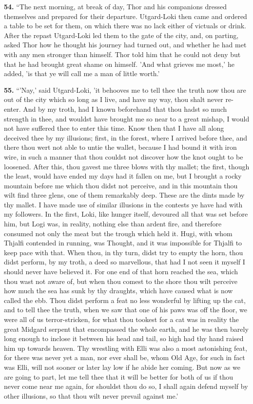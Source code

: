 \textbf{54.} ``The next morning, at break of day, Thor and his companions
dressed themselves and prepared for their departure. Utgard-Loki then
came and ordered a table to be set for them, on which there was no
lack either of victuals or drink. After the repast Utgard-Loki led
them to the gate of the city, and, on parting, asked Thor how he
thought his journey had turned out, and whether he had met with any
men stronger than himself. Thor told him that he could not deny but
that he had brought great shame on himself. 'And what grieves me
most,' he added, 'is that ye will call me a man of little worth.'

\textbf{55.} ``'Nay,' said Utgard-Loki, 'it behooves me to tell thee the truth
now thou are out of the city which so long as I live, and have my way,
thou shalt never re-enter. And by my troth, had I known beforehand
that thou hadst so much strength in thee, and wouldst have brought me
so near to a great mishap, I would not have suffered thee to enter
this time. Know then that I have all along deceived thee by my
illusions; first, in the forest, where I arrived before thee, and
there thou wert not able to untie the wallet, because I had bound it
with iron wire, in such a manner that thou couldst not discover how
the knot ought to be loosened. After this, thou gavest me three blows
with thy mallet; the first, though the least, would have ended my days
had it fallen on me, but I brought a rocky mountain before me which
thou didst not perceive, and in this mountain thou wilt find three
glens, one of them remarkably deep. These are the dints made by thy
mallet. I have made use of similar illusions in the contests ye have
had with my followers. In the first, Loki, like hunger itself,
devoured all that was set before him, but Logi was, in reality,
nothing else than ardent fire, and therefore consumed not only the
meat but the trough which held it. Hugi, with whom Thjalfi contended
in running, was Thought, and it was impossible for Thjalfi to keep
pace with that. When thou, in thy turn, didst try to empty the horn,
thou didst perform, by my troth, a deed so marvellous, that had I not
seen it myself I should never have believed it. For one end of that
horn reached the sea, which thou wast not aware of, but when thou
comest to the shore thou wilt perceive how much the sea has sunk by
thy draughts, which have caused what is now called the ebb. Thou didst
perform a feat no less wonderful by lifting up the cat, and to tell
thee the truth, when we saw that one of his paws was off the floor, we
were all of us terror-stricken, for what thou tookest for a cat was
in reality the great Midgard serpent that encompassed the whole earth,
and he was then barely long enough to inclose it between his head and
tail, so high had thy hand raised him up towards heaven. Thy wrestling
with Elli was also a most astonishing feat, for there was never yet a
man, nor ever shall be, whom Old Age, for such in fact was Elli, will
not sooner or later lay low if he abide her coming. But now as we are
going to part, let me tell thee that it will be better for both of us
if thou never come near me again, for shouldst thou do so, I shall
again defend myself by other illusions, so that thou wilt never
prevail against me.'

